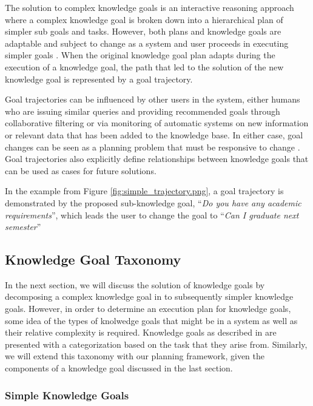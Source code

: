 \documentclass[11pt,letterpaper]{article}
\begin{document}
The solution to complex knowledge goals is an interactive reasoning approach where a complex knowledge goal is broken down into a hierarchical plan of simpler sub goals and tasks. However, both plans and knowledge goals are adaptable and subject to change as a system and user proceeds in executing simpler goals \cite{munoz-avila_case-based_2008}. When the original knowledge goal plan adapts during the execution of a knowledge goal, the path that led to the solution of the new knowledge goal is represented by a goal trajectory.

Goal trajectories can be influenced by other users in the system, either humans who are issuing similar queries and providing recommended goals through collaborative filtering \cite{hayes_case-based_2001} or via monitoring of automatic systems on new information or relevant data that has been added to the knowledge base. In either case, goal changes can be seen as a planning problem that must be responsive to change \cite{cox_mixed-initiative_2007}. Goal trajectories also explicitly define relationships between knowledge goals that can be used as cases for future solutions.

In the example from Figure \ref{fig:simple_trajectory.png}, a goal trajectory is demonstrated by the proposed sub-knowledge goal, ``\textit{Do you have any academic requirements}'', which leads the user to change the goal to ``\textit{Can I graduate next semester}''

\subsection{Knowledge Goal Taxonomy}

In the next section, we will discuss the solution of knowledge goals by decomposing a complex knowledge goal in to subsequently simpler knowledge goals. However, in order to determine an execution plan for knowledge goals, some idea of the types of knolwedge goals that might be in a system as well as their relative complexity is required. Knowledge goals as described in \cite{ram_knowledge_1990,ram_goal-based_1991} are presented with a categorization based on the task that they arise from. Similarly, we will extend this taxonomy with our planning framework, given the components of a knowledge goal discussed in the last section.

\subsubsection{Simple Knowledge Goals}
\end{document}
